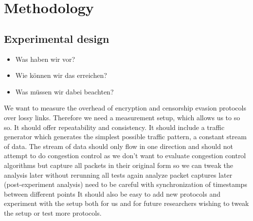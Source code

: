 
\chapter{Methodology}
\label{chap:methodology}

\section{Experimental design}
\begin{itemize}
	\item Was haben wir vor?
	\item Wie können wir das erreichen?
	\item Was müssen wir dabei beachten?
\end{itemize}
We want to measure the overhead of encryption and censorship evasion protocols over lossy links.
Therefore we need a measurement setup, which allows us to so so.
It should offer repeatability and consistency.
It should include a traffic generator which generates the simplest possible traffic pattern, a constant stream of data.
The stream of data should only flow in one direction and should not attempt to do congestion control as we don't want to evaluate congestion control algorithms but 
capture all packets in their original form so we can tweak the analysis later without rerunning all tests again
analyze packet captures later (post-experiment analysis)
need to be careful with synchronization of timestamps between different points
It should also be easy to add new protocols and experiment with the setup both for us and for future researchers wishing to tweak the setup or test more protocols.

